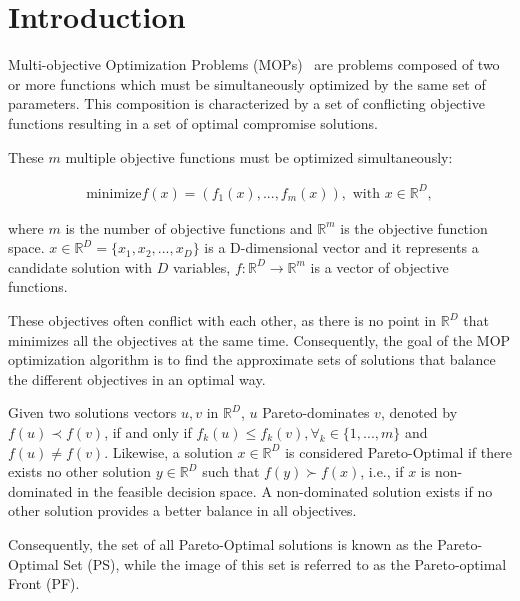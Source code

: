 \section{Introduction}

Multi-objective Optimization Problems (MOPs)~\cite{miettinen1999nonlinear} are problems composed of two or more functions which must be simultaneously optimized by the same set of parameters. This composition is characterized by a set of conflicting objective functions resulting in a set of optimal compromise solutions. 

These $m$ multiple objective functions must be optimized simultaneously:

\begin{align}\label{min_problem}
\text{minimize} f(x) = (f_1(x), ..., f_{m}(x)), \text{ with $x \in \mathbb{R}^{D}$},
\end{align}

where $m$ is the number of objective functions and $\mathbb{R}^m$ is the objective function space. $x \in \mathbb{R}^{D} = \{x_1, x_2, ..., x_D\}$ is a D-dimensional vector and it represents a candidate solution with ${D}$ variables, $f: \mathbb{R}^{D} \rightarrow \mathbb{R}^{m}$ is a vector of objective functions.%

These objectives often conflict with each other, as there is no point in $\mathbb{R}^{D}$ that minimizes all the objectives at the same time. Consequently, the goal of the MOP optimization algorithm is to find the approximate sets of solutions that balance the different objectives in an optimal way.

Given two solutions vectors $u, v$ in $\mathbb{R}^{D}$, $u$  Pareto-dominates $v$, denoted by $f(u) \prec f(v)$, if and only if $f_k(u) \leq f_k(v), \forall_k \in \{1,..., m\}$ and $ f(u) \neq f(v)$. Likewise, a solution $x \in \mathbb{R}^{D}$ is considered Pareto-Optimal if there exists no other solution $y \in \mathbb{R}^{D}$ such that $f(y) \succ f(x)$, i.e., if $x$ is non-dominated in the feasible decision space. A non-dominated solution exists if no other solution provides a better balance in all objectives.

Consequently, the set of all Pareto-Optimal solutions is known as the Pareto-Optimal Set (PS), while the image of this set is referred to as the Pareto-optimal Front (PF).\\

